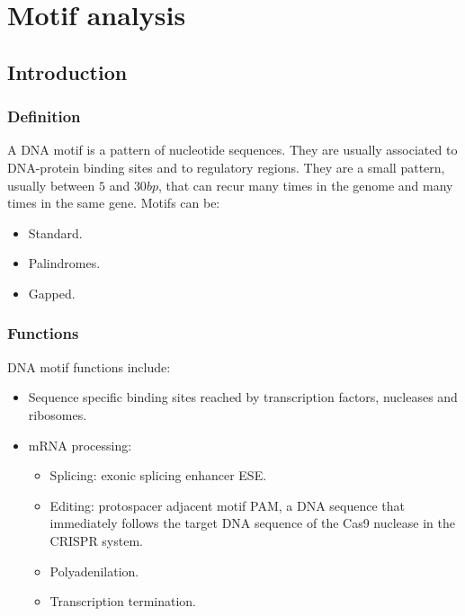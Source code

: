 \graphicspath{{chapters/04/images/}}
\chapter{Motif analysis}

\section{Introduction}

	\subsection{Definition}
	A DNA motif is a pattern of nucleotide sequences.
	They are usually associated to DNA-protein binding sites and to regulatory regions.
	They are a small pattern, usually between $5$ and $30bp$, that can recur many times in the genome and many times in the same gene.
	Motifs can be:

	\begin{multicols}{3}
		\begin{itemize}
			\item Standard.
			\item Palindromes.
			\item Gapped.
		\end{itemize}
	\end{multicols}

	\subsection{Functions}
	DNA motif functions include:

	\begin{multicols}{2}
		\begin{itemize}
			\item Sequence specific binding sites reached by transcription factors, nucleases and ribosomes.
			\item mRNA processing:

				\begin{itemize}
					\item Splicing: exonic splicing enhancer ESE.
					\item Editing: protospacer adjacent motif PAM, a DNA sequence that immediately follows the target DNA sequence of the Cas9 nuclease in the CRISPR system.
					\item Polyadenilation.
					\item Transcription termination.
				\end{itemize}

		\end{itemize}
	\end{multicols}

